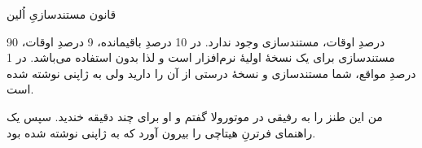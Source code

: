 \begin{tcolorbox}
    \centering
    قانون مستندسازیِ اُلین

    \raggedright
    90 درصدِ اوقات، مستندسازی وجود ندارد. در 10 درصدِ باقیمانده، 9 درصدِ اوقات، مستندسازی برای یک نسخهٔ اولیهٔ نرم‌افزار است و لذا بدون استفاده می‌باشد. در 1 درصدِ مواقع، شما مستندسازی و نسخهٔ درستی از آن را دارید ولی به ژاپنی نوشته شده است.

    من این طنز را به رفیقی در موتورولا گفتم و او برای چند دقیقه خندید. سپس یک راهنمای فرترنِ هیتاچی را بیرون آورد که به ژاپنی نوشته شده بود.
\end{tcolorbox}